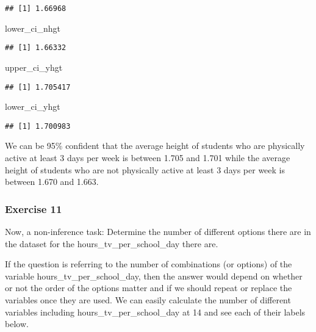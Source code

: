\documentclass[
]{article}
\newenvironment{Shaded}{\begin{snugshade}}{\end{snugshade}}
\newcommand{\NormalTok}[1]{#1}
\begin{document}
\begin{verbatim}
## [1] 1.66968
\end{verbatim}

\begin{Shaded}
\begin{Highlighting}[]
\NormalTok{lower_ci_nhgt}
\end{Highlighting}
\end{Shaded}

\begin{verbatim}
## [1] 1.66332
\end{verbatim}

\begin{Shaded}
\begin{Highlighting}[]
\NormalTok{upper_ci_yhgt}
\end{Highlighting}
\end{Shaded}

\begin{verbatim}
## [1] 1.705417
\end{verbatim}

\begin{Shaded}
\begin{Highlighting}[]
\NormalTok{lower_ci_yhgt }
\end{Highlighting}
\end{Shaded}

\begin{verbatim}
## [1] 1.700983
\end{verbatim}

We can be 95\% confident that the average height of students who are
physically active at least 3 days per week is between 1.705 and 1.701
while the average height of students who are not physically active at
least 3 days per week is between 1.670 and 1.663.

\hypertarget{exercise-11}{%
\subsubsection{Exercise 11}\label{exercise-11}}

Now, a non-inference task: Determine the number of different options
there are in the dataset for the hours\_tv\_per\_school\_day there are.

If the question is referring to the number of combinations (or options)
of the variable hours\_tv\_per\_school\_day, then the answer would
depend on whether or not the order of the options matter and if we
should repeat or replace the variables once they are used. We can easily
calculate the number of different variables including
hours\_tv\_per\_school\_day at 14 and see each of their labels below.
\end{document}
